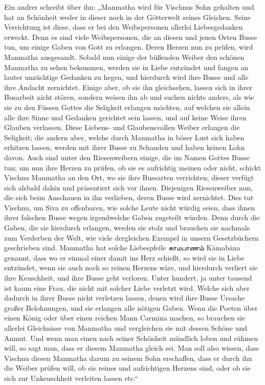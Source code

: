 \documentclass{article}
\newcommand{\TamilText}[1]{\texttamil{#1}}
\newcommand{\tam}[1]{\TamilText{#1}}
\begin{document}
Ein andrer schreibt über ihn: „Manmatha wird für Vischnus Sohn gehalten und hat an Schönheit weder in dieser noch in der Götterwelt seines Gleichen. Seine Verrichtung ist diese, dass er bei den Weibspersonen allerlei Liebesgedanken erweckt. Denn es sind viele Weibspersonen, die an diesen und jenen Orten Busse tun, um einige Gaben von Gott zu erlangen. Deren Herzen nun zu prüfen, wird Manmatha ausgesandt. Sobald nun einige der büßenden Weiber den schönen Manmatha zu sehen bekommen, werden sie in Liebe entzündet und fangen an lauter unzüchtige Gedanken zu hegen, und hierdurch wird ihre Busse und alle ihre Andacht zernichtet. Einige aber, ob sie ihn gleichsehen, lassen sich in ihrer Busarbeit nicht stören, sondern weisen ihn ab und suchen nichts anders, als wie sie zu den Füssen Gottes die Seligkeit erlangen möchten, auf welchen sie allein alle ihre Sinne und Gedanken gerichtet sein lassen, und auf keine Weise ihren Glauben verlassen. Diese Liebens- und Glaubensvollen Weiber erlangen die Seligkeit; die andern aber, welche durch Manmatha in böser Lust sich haben erhitzen lassen, werden mit ihrer Busse zu Schanden und haben keinen Lohn davon. Auch sind unter den Riesenweibern einige, die im Namen Gottes Busse tun; um nun ihre Herzen zu prüfen, ob sie es aufrichtig meinen oder nicht, schickt Vischnu Manmatha an den Ort, wo sie ihre Bussarten verrichten; dieser verfügt sich alsbald dahin und präsentiert sich vor ihnen. Diejenigen Riesenweiber nun, die sich beim Anschauen in ihn verlieben, deren Busse wird zernichtet. Dies tut Vischnu, um Siva zu offenbaren, wie solche Leute nicht würdig seien, dass ihnen ihrer falschen Busse wegen irgendwelche Gaben zugeteilt würden. Denn durch die Gaben, die sie hierdurch erlangen, werden sie stolz und brauchen sie nachmals zum Verderben der Welt, wie viele dergleichen Exempel in unsern Gesetzbüchern geschrieben sind. Manmatha hat solche Liebespfeile \tam{காமபாணம்} K\={a}mab\={a}na genannt, dass wo er einmal einer damit ins Herz schießt, so wird sie in Liebe entzündet, wenn sie auch noch so reinen Herzens wäre, und hierdurch verliert sie ihre Keuschheit, und ihre Busse geht verloren. Unter hundert, ja unter tausend ist kaum eine Frau, die nicht mit solcher Liebe verletzt wird. Welche sich aber dadurch in ihrer Busse nicht verletzen lassen, denen wird ihre Busse Ursache großer Belohnungen, und sie erlangen alle nötigen Gaben. Wenn die Poeten über einen König oder über einen reichen Mann Carmina machen, so brauchen sie allerlei Gleichnisse von Manmatha und vergleichen sie mit dessen Schöne und Anmut. Und wenn man einen nach seiner Schönheit mündlich loben und rühmen will, so sagt man, dass er diesem Manmatha gleich sei. Man soll also wissen, dass Vischnu diesen Manmatha darum zu seinem Sohn erschaffen, dass er durch ihn die Weiber prüfen will, ob sie reines und aufrichtigen Herzens sind, oder ob sie sich zur Unkeuschheit verleiten lassen etc.“
\end{document}
